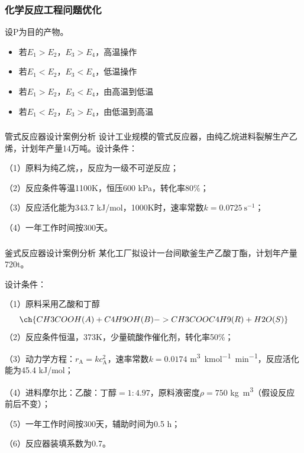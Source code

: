 \documentclass[dvipsnames, svgnames, x11names]{beamer}
\begin{document}
\begin{frame}
    \frametitle{化学反应工程问题优化}

    \begin{center}
    \end{center}

    设P为目的产物。
    \begin{itemize}
        \item 若$E_1 > E_2$，$E_3 > E_4$，高温操作
        \item 若$E_1 < E_2$，$E_3 < E_4$，低温操作
        \item 若$E_1 > E_2$，$E_3 < E_4$，由高温到低温
        \item 若$E_1 < E_2$，$E_3 > E_4$，由低温到高温
    \end{itemize}
\end{frame}


\begin{frame}[t]
    \frametitle{}
    \begin{block}{管式反应器设计案例分析}
        设计工业规模的管式反应器，由纯乙烷进料裂解生产乙烯，计划年产量14万吨。设计条件：

        （1）原料为纯乙烷，，反应为一级不可逆反应；

        （2）反应条件等温1100K，恒压600 kPa，转化率80\%；

        （3）反应活化能为343.7 kJ/mol，1000K时，速率常数$k = 0.0725 \ \mathrm{s^{-1}}$；

        （4）一年工作时间按300天。
    \end{block}
\end{frame}


\begin{frame}[t]
    \frametitle{}
    \begin{block}{釜式反应器设计案例分析}
        某化工厂拟设计一台间歇釜生产乙酸丁酯，计划年产量720t。

        设计条件：

        （1）原料采用乙酸和丁醇
        \[
            \ch{CH3COOH(A) + C4H9OH(B) -> CH3COOC4H9(R) + H2O(S)}
        \]
        （2）反应条件恒温，373K，少量硫酸作催化剂，转化率50\%；

        （3）动力学方程：$r_\mathrm{A} = kc_\mathrm{A}^2$，速率常数$k=0.0174$ \si{m^3.kmol^{-1}.min^{-1}}，反应活化能为45.4 kJ/mol；

        （4）进料摩尔比：乙酸：丁醇$=1:4.97$，原料液密度$\rho = 750$ \si{kg.m^3}（假设反应前后不变）；

        （5）一年工作时间按300天，辅助时间为0.5 h；

        （6）反应器装填系数为0.7。
    \end{block}
\end{frame}
\end{document}
